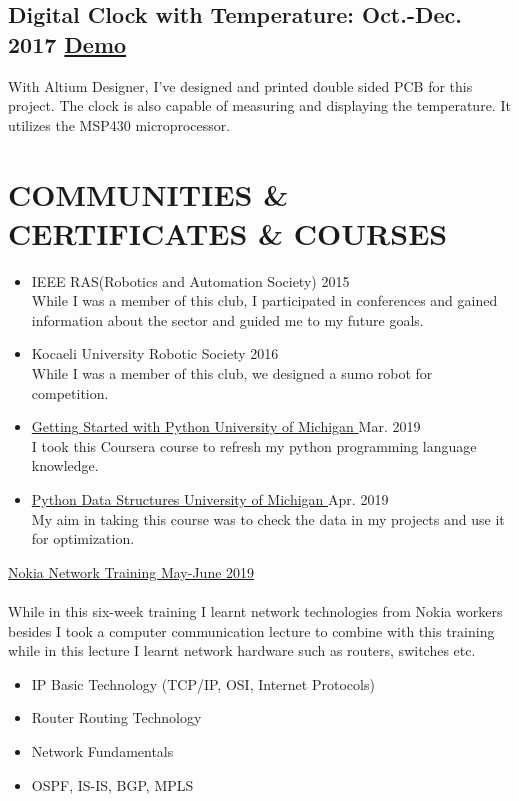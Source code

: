 \documentclass[10pt]{article}
\begin{document}
\subsection{Digital Clock with Temperature: Oct.-Dec. 2017 \textcolor{Mycolor3}{\href{https://github.com/Zrrck/Digital-Clock-with-Teperature-Display}{}}
\textcolor{Mycolor2}{\href{https://youtu.be/F9gKzfekm9k}{\small {Demo}}} }
With Altium Designer, I've designed and printed double sided PCB for this project. The clock is also capable of measuring and displaying the temperature. It utilizes the MSP430 microprocessor.




\section{COMMUNITIES \& CERTIFICATES \& COURSES}


\justifying

\begin{itemize}
\justifying
\itemsep0em
\item IEEE RAS(Robotics and Automation Society)  2015 \\
While I was a member of this club, I participated in conferences and gained information about the sector and guided me to my future goals. 
\item Kocaeli University Robotic Society  2016 \\
While I was a member of this club, we designed a sumo robot for competition. 
\item \textcolor{Mycolor5}{\href{https://www.coursera.org/account/accomplishments/certificate/8VLTSNMH2832}{Getting Started with Python University of Michigan }}
Mar. 2019 \\
I took this Coursera course to refresh my python programming language knowledge.

 \item \textcolor{Mycolor5}{\href{https://www.coursera.org/account/accomplishments/certificate/X7QKJD4ASQQD}{Python Data Structures University of Michigan }}
 Apr. 2019 \\
My aim in taking this course was to check the data in my projects and use it for optimization.
\end{itemize}

\underline{Nokia Network Training May-June 2019}  \\ \\
While in this six-week training I learnt network technologies from Nokia workers besides I took a computer communication lecture to combine with this training while in this lecture I learnt network hardware such as routers, switches etc.
   \begin{itemize}
 \justifying
   
\itemsep0em
\item IP Basic Technology (TCP/IP, OSI, Internet Protocols)

\item     Router Routing Technology
 \item    Network Fundamentals
 \item    OSPF, IS-IS, BGP,  MPLS


\end{itemize} 
\end{document}
